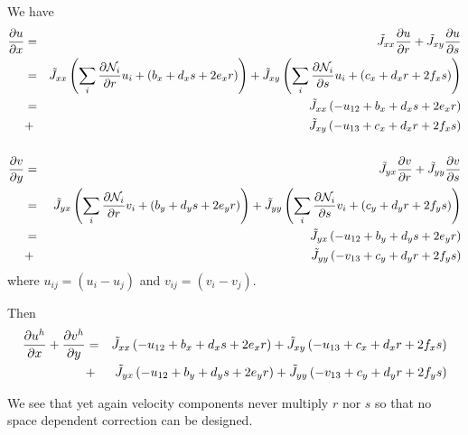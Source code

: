 We have
\begin{eqnarray}
\frac{\partial u}{\partial x} 
&=& \tilde{J}_{xx} \frac{\partial u}{\partial r} +  \tilde{J}_{xy} \frac{\partial u}{\partial s}  \nonumber\\
&=& \tilde{J}_{xx} \left( \sum_i \frac{\partial {\mathcal{N}}_i}{\partial r} u_i + (b_x + d_xs + 2e_xr )  \right) 
 +  \tilde{J}_{xy} \left( \sum_i \frac{\partial {\mathcal{N}}_i}{\partial s} u_i + (c_x + d_xr + 2f_xs )  \right)  \nonumber\\
&=& \tilde{J}_{xx} \left( - u_{12} + b_x + d_xs + 2e_xr \right) \nonumber\\ 
&+& \tilde{J}_{xy} \left( - u_{13} + c_x + d_xr + 2f_xs \right) \nonumber\\ 
\nonumber\\
\frac{\partial v}{\partial y} 
&=& \tilde{J}_{yx} \frac{\partial v}{\partial r} +  \tilde{J}_{yy} \frac{\partial v}{\partial s} \nonumber\\
&=& \tilde{J}_{yx} \left(  \sum_i \frac{\partial {\mathcal{N}}_i}{\partial r} v_i + (b_y + d_ys + 2e_yr ) \right)  
+  \tilde{J}_{yy} \left( \sum_i \frac{\partial {\mathcal{N}}_i}{\partial s} v_i + (c_y + d_yr + 2f_ys ) \right) \nonumber\\
&=& \tilde{J}_{yx} \left( -u_{12} + b_y + d_ys + 2e_yr  \right)  \nonumber\\
&+& \tilde{J}_{yy} \left( -v_{13} + c_y + d_yr + 2f_ys  \right) \nonumber
\end{eqnarray}
where $u_{ij}=(u_i-u_j)$ and $v_{ij}=(v_i-v_j)$.

Then 
\begin{eqnarray}
\frac{\partial u^h}{\partial x}
+
\frac{\partial v^h}{\partial y}
&=& \tilde{J}_{xx} \left( - u_{12} + b_x + d_xs + 2e_xr \right) 
+ \tilde{J}_{xy} \left( - u_{13} + c_x + d_xr + 2f_xs \right) \nonumber\\
&+& \tilde{J}_{yx} \left( -u_{12} + b_y + d_ys + 2e_yr  \right) 
+ \tilde{J}_{yy} \left( -v_{13} + c_y + d_yr + 2f_ys  \right) \nonumber
\end{eqnarray}

We see that yet again velocity components never multiply $r$ nor $s$ so that 
no space dependent correction can be designed. 





